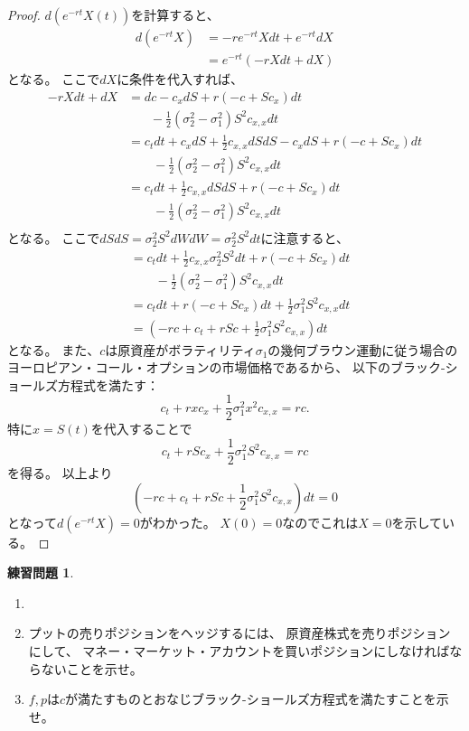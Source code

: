 \documentclass[uplatex]{jsarticle}
\theoremstyle{definition}
\newtheorem{prob}[prob]{練習問題}
\begin{document}
\begin{proof}
  \(d(e^{-rt}X(t))\)を計算すると、
  \begin{align*}
    d(e^{-rt}X)
    &= -re^{-rt}Xdt + e^{-rt}dX \\
    &= e^{-rt}\left( -rXdt + dX \right)
  \end{align*}
  となる。
  ここで\(dX\)に条件を代入すれば、
  \begin{align*}
    -rXdt + dX &= dc - c_xdS + r \left(
    - c + Sc_x\right)dt \\
    & \ \ \ \ \ \ \ \
    - \frac{1}{2}(\sigma_2^2-\sigma_1^2)S^2c_{x,x}dt \\
    &= c_tdt + c_xdS + \frac{1}{2}c_{x,x}dSdS - c_xdS
    + r \left( - c + Sc_x\right)dt \\
    &\ \ \ \ \ \ \ \ \
    - \frac{1}{2}(\sigma_2^2-\sigma_1^2)S^2c_{x,x}dt \\
    &= c_tdt + \frac{1}{2}c_{x,x}dSdS
    + r \left( - c + Sc_x\right)dt \\
    &\ \ \ \ \ \ \ \ \
    - \frac{1}{2}(\sigma_2^2-\sigma_1^2)S^2c_{x,x}dt \\
  \end{align*}
  となる。
  ここで\(dSdS = \sigma_2^2S^2dWdW = \sigma_2^2S^2dt\)に注意すると、
  \begin{align*}
    &= c_tdt + \frac{1}{2}c_{x,x}\sigma_2^2S^2dt
    + r \left( - c + Sc_x\right)dt \\
    &\ \ \ \ \ \ \ \ \
    - \frac{1}{2}(\sigma_2^2-\sigma_1^2)S^2c_{x,x}dt \\
    &= c_tdt + r \left( - c + Sc_x\right)dt
    + \frac{1}{2}\sigma_1^2S^2c_{x,x}dt \\
    &= \left( -rc + c_t + rSc +
    \frac{1}{2}\sigma_1^2S^2c_{x,x}\right)dt
  \end{align*}
  となる。
  また、\(c\)は原資産がボラティリティ\(\sigma_1\)の幾何ブラウン運動に従う場合の
  ヨーロピアン・コール・オプションの市場価格であるから、
  以下のブラック-ショールズ方程式を満たす：
  \[
  c_t + rxc_x + \frac{1}{2}\sigma_1^2x^2c_{x,x}= rc.
  \]
  特に\(x=S(t)\)を代入することで
  \[
  c_t + rSc_x + \frac{1}{2}\sigma_1^2S^2c_{x,x}= rc
  \]
  を得る。
  以上より
  \[
  \left( -rc + c_t + rSc +
  \frac{1}{2}\sigma_1^2S^2c_{x,x}\right)dt = 0
  \]
  となって\(d(e^{-rt}X)=0\)がわかった。
  \(X(0)=0\)なのでこれは\(X=0\)を示している。
\end{proof}


\begin{prob}\label{prob: 4.12}
  \begin{enumerate}
    \item \label{enumi: 4.12-1}
    \item \label{enumi: 4.12-2}
    プットの売りポジションをヘッジするには、
    原資産株式を売りポジションにして、
    マネー・マーケット・アカウントを買いポジションにしなければならないことを示せ。
    \item \label{enumi: 4.12-3}
    \(f,p\)は\(c\)が満たすものとおなじブラック-ショールズ方程式を満たすことを示せ。
  \end{enumerate}
\end{prob}
\end{document}
